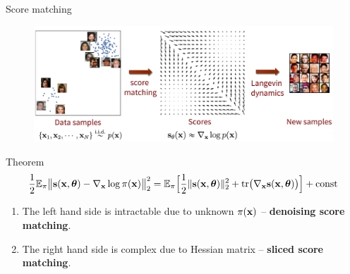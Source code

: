 \begin{frame}{Score matching}
	\vspace{-0.3cm}
	\begin{figure}
		\centering
		\includegraphics[width=0.8\linewidth]{figs/smld}
	\end{figure}
	\vspace{-0.6cm}
	\begin{block}{Theorem}
		\vspace{-0.6cm}
		\[
			\frac{1}{2} \mathbb{E}_{\pi}\bigl\| \mathbf{s}(\mathbf{x}, \boldsymbol{\theta}) - \nabla_{\mathbf{x}} \log \pi(\mathbf{x}) \bigr\|^2_2 = \mathbb{E}_{\pi}\Bigr[ \frac{1}{2}\| \mathbf{s}(\mathbf{x}, \boldsymbol{\theta}) \|_2^2 + \text{tr}\bigl(\nabla_{\mathbf{x}} \mathbf{s}(\mathbf{x}, \boldsymbol{\theta})\bigr) \Bigr] + \text{const}
		\]
		\vspace{-0.4cm}
	\end{block}
	\begin{enumerate}
	    \item The left hand side is intractable due to unknown $\pi(\mathbf{x})$ -- \textbf{denoising score matching}. 
	    \item The right hand side is complex due to Hessian matrix -- \textbf{sliced score matching}.
	\end{enumerate}
\end{frame}
